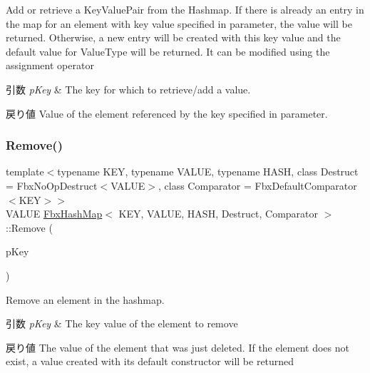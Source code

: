 Add or retrieve a Key\+Value\+Pair from the Hashmap. If there is already an entry in the map for an element with key value specified in parameter, the value will be returned. Otherwise, a new entry will be created with this key value and the default value for Value\+Type will be returned. It can be modified using the assignment operator 
\begin{DoxyParams}{引数}
{\em p\+Key} & The key for which to retrieve/add a value. \\
\hline
\end{DoxyParams}
\begin{DoxyReturn}{戻り値}
Value of the element referenced by the key specified in parameter. 
\end{DoxyReturn}
\mbox{\label{class_fbx_hash_map_abe6d776a5b88b75b82d92e9c9dd5b513}} 
\subsubsection{\texorpdfstring{Remove()}{Remove()}}
{\footnotesize\ttfamily template$<$typename K\+EY, typename V\+A\+L\+UE, typename H\+A\+SH, class Destruct = Fbx\+No\+Op\+Destruct$<$\+V\+A\+L\+U\+E$>$, class Comparator = Fbx\+Default\+Comparator$<$\+K\+E\+Y$>$$>$ \\
V\+A\+L\+UE \hyperlink{class_fbx_hash_map}{Fbx\+Hash\+Map}$<$ K\+EY, V\+A\+L\+UE, H\+A\+SH, Destruct, Comparator $>$\+::Remove (\begin{DoxyParamCaption}\item[{const K\+EY \&}]{p\+Key }\end{DoxyParamCaption})}

Remove an element in the hashmap. 
\begin{DoxyParams}{引数}
{\em p\+Key} & The key value of the element to remove \\
\hline
\end{DoxyParams}
\begin{DoxyReturn}{戻り値}
The value of the element that was just deleted. If the element does not exist, a value created with its default constructor will be returned 
\end{DoxyReturn}
\mbox{\label{class_fbx_hash_map_a57577e8a4b29826e68f61e0d086f90d8}} 
